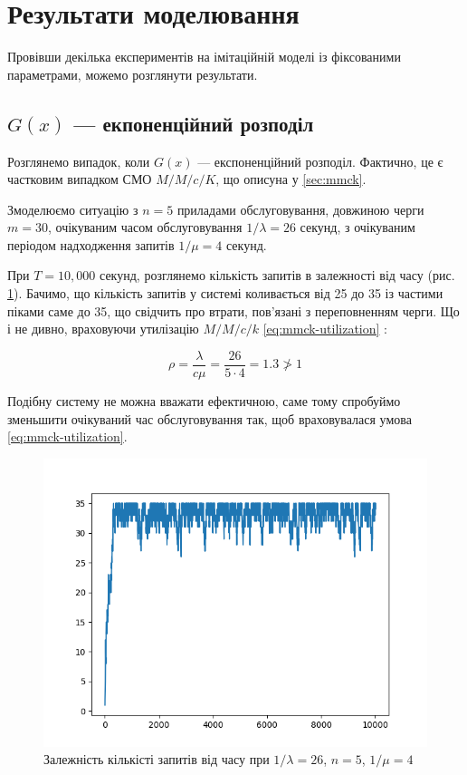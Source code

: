 \documentclass[14pt]{extarticle}
\begin{document}
\newpage

\section{Результати моделювання}

Провівши декілька експериментів на імітаційній моделі із фіксованими
параметрами, можемо розглянути результати.

\subsection{\(G(x)\)  --- екпоненційний розподіл}

Розглянемо випадок, коли \(G(x)\) --- експоненційний розподіл. Фактично, це є
частковим випадком СМО \(M/M/c/K\), що описуна у \ref{sec:mmck}.

Змоделюємо ситуацію з \(n = 5\) приладами обслуговування, довжиною черги
\(m = 30\), очікуваним часом обслуговування \(1 / \lambda = 26\) секунд, з очікуваним
періодом надходження запитів \(1 / \mu = 4\) секунд.

При \(T = 10,000\) секунд, розглянемо кількість запитів в залежності від часу
(рис. \ref{img:exp-fail-first-requests}). Бачимо, що кількість запитів у системі
коливається від 25 до 35 із частими піками саме до 35, що свідчить про втрати,
пов\textquoteright язані з переповненням черги. Що і не дивно, враховуючи
утилізацію \(M/M/c/k\) \ref{eq:mmck-utilization} :

\begin{equation*}
  \rho = \frac{\lambda}{c \mu} = \frac{26}{5 \cdot 4} = 1.3 \ngtr 1
\end{equation*}

Подібну систему не можна вважати ефектичною, саме тому спробуймо зменьшити
очікуваний час обслуговування так, щоб враховувалася умова
\ref{eq:mmck-utilization}.

\begin{figure}
  \centering
  \includegraphics{fail-seconds-requests_in_system.png}\caption{{Залежність
      кількісті запитів від часу при \(1/\lambda = 26\), \(n = 5\),
      \(1/\mu = 4\)}}\label{img:exp-fail-first-requests}
\end{figure}
\end{document}
